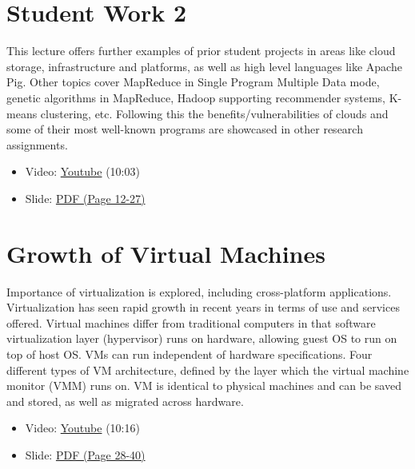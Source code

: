 \section{Student Work 2}\label{student-work-2}

This lecture offers further examples of prior student projects in areas
like cloud storage, infrastructure and platforms, as well as high level
languages like Apache Pig. Other topics cover MapReduce in Single
Program Multiple Data mode, genetic algorithms in MapReduce, Hadoop
supporting recommender systems, K-means clustering, etc. Following this
the benefits/vulnerabilities of clouds and some of their most well-known
programs are showcased in other research assignments.

\begin{itemize}
\tightlist
\item
  Video: \href{https://www.youtube.com/watch?v=DqaQ0kemmaw}{Youtube}
  (10:03)
\end{itemize}

\begin{itemize}
\tightlist
\item
  Slide:
  \href{https://drive.google.com/open?id=0B88HKpainTSfQU1uQmxZWHdWQ1k}{PDF
  (Page 12-27)}
\end{itemize}

\section{Growth of Virtual
Machines}\label{growth-of-virtual-machines}

Importance of virtualization is explored, including cross-platform
applications. Virtualization has seen rapid growth in recent years in
terms of use and services offered. Virtual machines differ from
traditional computers in that software virtualization layer (hypervisor)
runs on hardware, allowing guest OS to run on top of host OS. VMs can
run independent of hardware specifications. Four different types of VM
architecture, defined by the layer which the virtual machine monitor
(VMM) runs on. VM is identical to physical machines and can be saved and
stored, as well as migrated across hardware.

\begin{itemize}
\tightlist
\item
  Video: \href{https://www.youtube.com/watch?v=5oKoAPCXLws}{Youtube}
  (10:16)
\item
  Slide:
  \href{https://drive.google.com/open?id=0B88HKpainTSfQU1uQmxZWHdWQ1k}{PDF
  (Page 28-40)}
\end{itemize}

